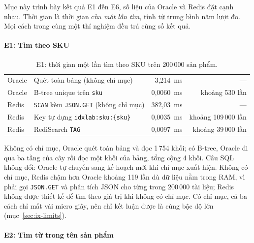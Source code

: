 Mục này trình bày kết quả E1 đến E6, số liệu của Oracle và Redis đặt cạnh nhau. Thời gian là thời gian của \emph{một lần tìm}, tính từ trung bình năm lượt đo. Mọi cách trong cùng một thí nghiệm đều trả cùng số kết quả.

\paragraph{E1: Tìm theo SKU}\label{sec:ix-e1}

\begin{table}[!htbp]
\centering
\caption{E1: thời gian một lần tìm theo SKU trên 200\,000 sản phẩm.}\label{tab:ix-e1}
\reporttablesetup
\begin{tabularx}{\linewidth}{|l|L|r|r|}
\hline
{}
 &  &  &  \\ \hline
Oracle & Quét toàn bảng (không chỉ mục) & 3,214~ms & --- \\ \hline
Oracle & B-tree unique trên \texttt{sku} & 0,0060~ms & khoảng 530 lần \\ \hline
Redis & \texttt{SCAN} kèm \texttt{JSON.GET} (không chỉ mục) & 382,03~ms & --- \\ \hline
Redis & Key tự dựng \texttt{idxlab:sku:\{sku\}} & 0,0035~ms & khoảng 109\,000 lần \\ \hline
Redis & RediSearch \texttt{TAG} & 0,0097~ms & khoảng 39\,000 lần \\ \hline
\end{tabularx}
\end{table}

Không có chỉ mục, Oracle quét toàn bảng và đọc 1\,754 khối; có B-tree, Oracle đi qua ba tầng của cây rồi đọc một khối của bảng, tổng cộng 4 khối. Câu SQL không đổi: Oracle tự chuyển sang kế hoạch mới khi chỉ mục xuất hiện. Không có chỉ mục, Redis chậm hơn Oracle khoảng 119 lần dù dữ liệu nằm trong RAM, vì phải gọi \texttt{JSON.GET} và phân tích JSON cho từng trong 200\,000 tài liệu; Redis không được thiết kế để tìm theo giá trị khi không có chỉ mục. Có chỉ mục, cả ba cách chỉ mất vài micro giây, nên chỉ kết luận được là cùng bậc độ lớn (mục~\ref{sec:ix-limits}).

\paragraph{E2: Tìm từ trong tên sản phẩm}\label{sec:ix-e2}

